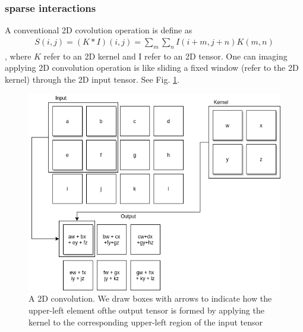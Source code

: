     \subsubsection{sparse interactions}
    A conventional 2D covolution operation is define as
    \begin{gather}
    	S(i,j) = (K * I)(i,j) = \sum_{m}\sum_{n}I(i+m,j+n)K(m,n)
    \end{gather}
    , where $K$ refer to an 2D kernel and I refer to an 2D tensor.
    One can imaging applying 2D convolution operation is like sliding a fixed window (refer to the 2D kernel) through the 2D input tensor. See Fig. \ref{fig:ch2-convolution-kernel}.
     \begin{figure}[htpb]
    	\centering
    	\includegraphics[scale=0.4]{figures/ch2/convolution-kernel.png}
    	\caption{ A 2D convolution. We draw boxes with arrows to indicate how the upper-left element ofthe output tensor is formed by applying the kernel to the corresponding upper-left region of the input tensor \cite{Goodfellow-et-al-2016}}
    	\label{fig:ch2-convolution-kernel}
    \end{figure}
    
